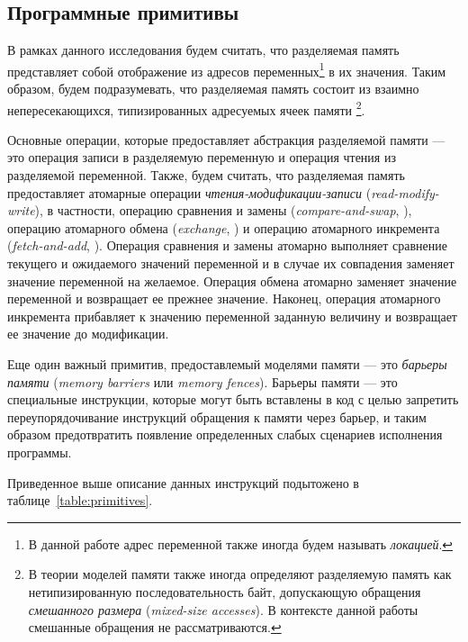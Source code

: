 \subsection{Программные примитивы}
\label{sec:models-primitives}

В рамках данного исследования будем считать, что
разделяемая память представляет собой отображение
из адресов переменных\footnote{В данной работе адрес переменной 
также иногда будем называть \emph{локацией}.} в их значения. 
Таким образом, будем подразумевать, 
что разделяемая память состоит из взаимно непересекающихся, 
типизированных адресуемых ячеек памяти%
\footnote{В теории моделей памяти также иногда определяют 
разделяемую память как нетипизированную последовательность байт, 
допускающую обращения \emph{смешанного размера} (\emph{mixed-size accesses}). 
В контексте данной работы смешанные обращения не рассматриваются.}.

Основные операции, которые предоставляет абстракция разделяемой памяти --- 
это операция записи в разделяемую переменную и операция чтения из разделяемой переменной. 
Также, будем считать, что разделяемая память предоставляет атомарные операции 
\emph{чтения-модификации-записи} (\emph{read-modify-write}), 
в частности, операцию сравнения и замены (\emph{compare-and-swap}, \CAS), 
операцию атомарного обмена (\emph{exchange}, \EXCHG) 
и операцию атомарного инкремента (\emph{fetch-and-add}, \FADD).
Операция сравнения и замены атомарно выполняет сравнение 
текущего и ожидаемого значений переменной и в случае 
их совпадения заменяет значение переменной на желаемое.
Операция обмена атомарно заменяет значение переменной 
и возвращает ее прежнее значение. 
Наконец, операция атомарного инкремента прибавляет 
к значению переменной заданную величину и
возвращает ее значение до модификации.



Еще один важный примитив, 
предоставлемый моделями памяти --- это \emph{барьеры памяти} 
(\emph{memory barriers} или \emph{memory fences}).
Барьеры памяти --- это специальные инструкции, которые 
могут быть вставлены в код с целью запретить 
переупорядочивание инструкций обращения к памяти через барьер, 
и таким образом предотвратить появление 
определенных слабых сценариев исполнения программы.

Приведенное выше описание данных инструкций
подытожено в таблице~\ref{table:primitives}. 

